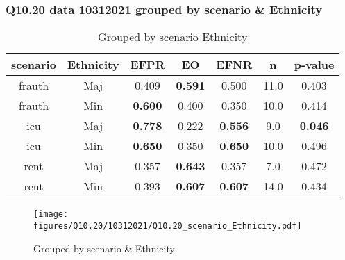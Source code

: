 \subsubsection{Q10.20 data 10312021 grouped by scenario \& Ethnicity}

\begin{comment}
                   EFPR        EO      EFNR     n    pvalue
(frauth, Maj)  0.409091  0.590909  0.500000  11.0  0.403364
(frauth, Min)  0.600000  0.400000  0.350000  10.0  0.414216
(icu, Maj)     0.777778  0.222222  0.555556   9.0  0.045798
(icu, Min)     0.650000  0.350000  0.650000  10.0  0.495628
(rent, Maj)    0.357143  0.642857  0.357143   7.0  0.472498
(rent, Min)    0.392857  0.607143  0.607143  14.0  0.433871
\end{comment}

\begin{table}[h]
    \centering
    \begin{tabular}{|c|c|c|c|c|c|c|}
        \hline
        scenario & Ethnicity & EFPR & EO & EFNR & n & p-value\\
        \hline
        frauth & Maj & 0.409 & \textbf{0.591} & 0.500 & 11.0 & 0.403\\
		frauth & Min & \textbf{0.600} & 0.400 & 0.350 & 10.0 & 0.414\\
		icu & Maj & \textbf{0.778} & 0.222 & \textbf{0.556} & 9.0 & \textbf{0.046}\\
		icu & Min & \textbf{0.650} & 0.350 & \textbf{0.650} & 10.0 & 0.496\\
		rent & Maj & 0.357 & \textbf{0.643} & 0.357 & 7.0 & 0.472\\
		rent & Min & 0.393 & \textbf{0.607} & \textbf{0.607} & 14.0 & 0.434\\
		
        \hline
    \end{tabular}
    \caption{Grouped by scenario Ethnicity}
    \label{tab:my_label}
\end{table}
\begin{figure}[h]
    \centering
    \texttt{[image: figures/Q10.20/10312021/Q10.20\_scenario\_Ethnicity.pdf]}
    \caption{Grouped by scenario \& Ethnicity}
    \label{fig:my_label}
\end{figure}
